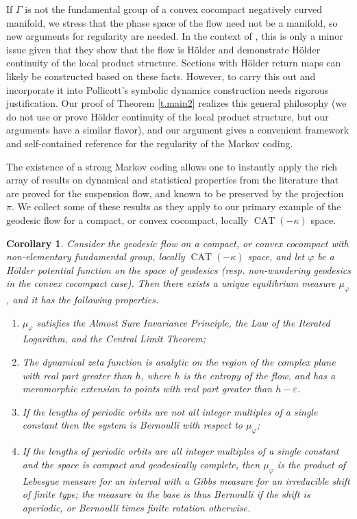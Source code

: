 \documentclass[11pt]{article}
\let\epsilon\varepsilon
\newtheorem{corx}[thmx]{Corollary}
\theoremstyle{definition}
\numberwithin{equation}{section}
\DeclareMathOperator{\CAT}{CAT}
\begin{document}
If $\Gamma$ is not the fundamental group of a convex cocompact negatively curved manifold, we stress that the phase space of the flow need not be a manifold, so new arguments for regularity are needed. In the context of \cite{bcls}, this is only a minor issue given that they show that the flow is Hölder and demonstrate Hölder continuity of the local product structure. Sections with Hölder return maps can likely be constructed based on these facts. However, to carry this out and incorporate it into Pollicott's symbolic dynamics construction needs rigorous justification. Our proof of Theorem \ref{t.main2} realizes this general philosophy (we do not use or prove Hölder continuity of the local product structure, but our arguments have a similar flavor), and our argument gives a convenient framework and self-contained reference for the regularity of the Markov coding.

The existence of a strong Markov coding allows one to instantly apply the rich array of results on dynamical and statistical properties from the literature that are proved for the suspension flow, and known to be preserved by the projection $\pi$. We collect some of these results as they apply to our primary example of the geodesic flow for a compact, or convex cocompact, locally $\CAT(-\kappa)$ space.

\begin{corx}\label{t.applications}
Consider the geodesic flow on a compact, or convex cocompact with non-elementary fundamental group, locally $\CAT(-\kappa)$ space, and let $\varphi$ be a Hölder potential function on the space of geodesics (resp. non-wandering geodesics in the convex cocompact case). Then there exists a unique equilibrium measure $\mu_\varphi$, and it has the following properties.
\begin{enumerate}
\item\label{t.applications1} $\mu_\varphi$ satisfies the Almost Sure Invariance Principle, the Law of the Iterated Logarithm, and the Central Limit Theorem;
\item\label{t.applications2} The dynamical zeta function is analytic on the region of the complex plane with real part greater than $h$, where $h$ is the entropy of the flow, and has a meromorphic extension to points with real part greater than $h- \epsilon$.
\item\label{t.applications3} If the lengths of periodic orbits are not all integer multiples of a single constant then the system is Bernoulli with respect to $\mu_\varphi$;
\item\label{t.applications4} If the lengths of periodic orbits are all integer multiples of a single constant and the space is compact and geodesically complete, then $\mu_\varphi$ is the product of Lebesgue measure for an interval with a Gibbs measure for an irreducible shift of finite type; the measure in the base is thus Bernoulli if the shift is aperiodic, or Bernoulli times finite rotation otherwise.
\end{enumerate}
\end{corx}
\end{document}
